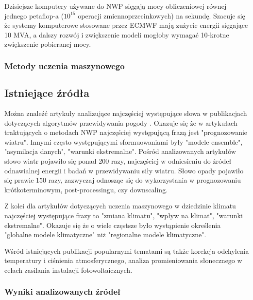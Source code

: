 Dzisiejsze komputery używane do NWP sięgają mocy obliczeniowej równej jednego petaflop-a ($10^{15}$ operacji
zmiennoprzecinkowych) na sekundę. Szacuje się że systemy komputerowe stosowane przez ECMWF mają zużycie energii
sięgające 10 MVA, a dalszy rozwój i zwiększenie modeli mogłoby wymagać 10-krotne zwiększenie pobieranej mocy.

\subsubsection{Metody uczenia maszynowego}

\subsection{Istniejące źródła}

Można znaleźć artykuły analizujące najczęściej występujące słowa
w publikacjach dotyczących algorytmów przewidywania pogody 
\cite{ml-in-weather-prediction}. Okazuje się że w artykułach traktujących o
metodach NWP najczęściej występującą frazą jest "prognozowanie wiatru". Innymi 
często występującymi sformuowaniami były "modele ensemble", "asymilacja danych",
"warunki ekstremalne". Pośród analizowanych artykułów słowo wiatr pojawiło się
ponad 200 razy, najczęściej w odniesieniu do źródeł odnawialnej energii i badań
w przewidywaniu siły wiatru. Słowo opady pojawiło się prawie 150 razy, zazwyczaj
odnosząc się do wykorzystania w prognozowaniu krótkoterminowym, post-processingu, czy
downscaling. 

Z kolei dla artykułów dotyczących uczenia maszynowego
w dziedzinie klimatu najczęściej występujące frazy to "zmiana klimatu", 
"wpływ na klimat", "warunki ekstremalne". Okazuje się że o wiele częstsze było
wystąpienie określenia "globalne modele klimatyczne" niż "regionalne modele 
klimatyczne". 

Wśród istniejących publikacji popularnymi tematami są także korekcja odchylenia 
temperatury i ciśnienia atmosferycznego, analiza promieniowania słonecznego w celach
zasilania instalacji fotowoltaicznych.

\subsubsection*{Wyniki analizowanych źródeł}

